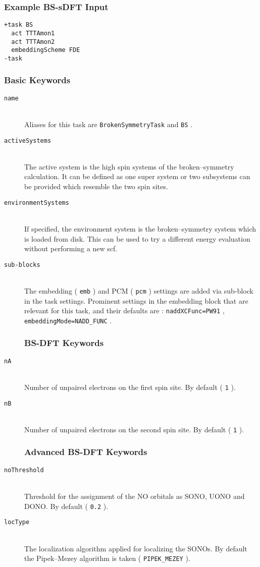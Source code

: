 \documentclass[bibliography=totocnumbered,a4paper,10pt,oneside]{scrbook}
\newcommand{\ttt}[1]{%
  \begingroup\setlength{\fboxsep}{1pt}%
  \colorbox{serenity-green!30}{\texttt{\hspace*{2pt}\vphantom{(g}#1\hspace*{2pt}}}%
  \endgroup
}
\begin{document}
\subsubsection{Example BS-sDFT Input}
\begin{lstlisting}
+task BS
  act TTTAmon1
  act TTTAmon2
  embeddingScheme FDE
-task
\end{lstlisting}

\subsubsection{Basic Keywords}
\begin{description}
	\item [\texttt{name}]\hfill \\
	Aliases for this task are \ttt{BrokenSymmetryTask} and \ttt{BS}.
	\item [\texttt{activeSystems}]\hfill \\
	The active system is the high spin systems of the broken--symmetry calculation. It can
	be defined as one super system or two subsystems can be provided which resemble the two
	spin sites.
	\item [\texttt{environmentSystems}]\hfill \\
	If specified, the environment system is the broken--symmetry system which is loaded
	from disk. This can be used to try a different energy evaluation without performing a 
	new scf.
	\item[\texttt{sub-blocks}]\hfill \\
	The embedding (\ttt{emb}) and PCM (\ttt{pcm}) settings are added via sub-block 
	in the task settings. Prominent
	settings in the embedding block that are relevant for this task, and their defaults are
	:\ttt{naddXCFunc=PW91}, \ttt{embeddingMode=NADD\_FUNC}.
\subsubsection{BS-DFT Keywords}
	\item [\texttt{nA}]\hfill \\
	Number of unpaired electrons on the first spin site. By default (\ttt{1}).
	\item [\texttt{nB}]\hfill \\
	Number of unpaired electrons on the second spin site. By default (\ttt{1}).
\subsubsection{Advanced BS-DFT Keywords}
	\item [\texttt{noThreshold}]\hfill \\
	Threshold for the assignment of the NO orbitals as SONO, UONO and DONO. By default (\ttt{0.2}).
	\item [\texttt{locType}]\hfill \\
	The localization algorithm applied for localizing the SONOs. By default the
	Pipek--Mezey algorithm is taken (\ttt{PIPEK\_MEZEY}).

\end{description}
\end{document}
